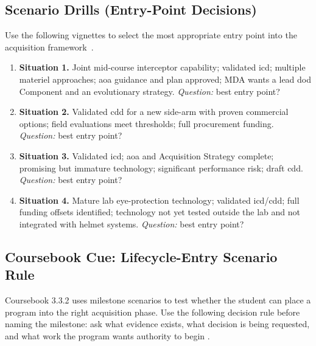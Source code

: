 \documentclass[../main.tex]{subfiles}
\begin{document}
\subsection{Scenario Drills (Entry-Point Decisions)}
Use the following vignettes to select the most appropriate entry point into the acquisition framework~\autocite{edo-3-3-2-acq-milestones-phases-2025}.
\begin{enumerate}
  \item \textbf{Situation 1.} Joint mid-course interceptor capability; validated \ac{icd}; multiple materiel approaches; \ac{aoa} guidance and plan approved; MDA wants a lead \ac{dod} Component and an evolutionary strategy. \emph{Question:} best entry point?
  \item \textbf{Situation 2.} Validated \ac{cdd} for a new side-arm with proven commercial options; field evaluations meet thresholds; full procurement funding. \emph{Question:} best entry point?
  \item \textbf{Situation 3.} Validated \ac{icd}; \ac{aoa} and Acquisition Strategy complete; promising but immature technology; significant performance risk; draft \ac{cdd}. \emph{Question:} best entry point?
  \item \textbf{Situation 4.} Mature lab eye-protection technology; validated \ac{icd}/\ac{cdd}; full funding offsets identified; technology not yet tested outside the lab and not integrated with helmet systems. \emph{Question:} best entry point?
\end{enumerate}

\subsection{Coursebook Cue: Lifecycle-Entry Scenario Rule}

Coursebook 3.3.2 uses milestone scenarios to test whether the student can place
a program into the right acquisition phase. Use the following decision rule
before naming the milestone: ask what evidence exists, what decision is being
requested, and what work the program wants authority to begin
\autocite{edo-3-3-2-acq-milestones-phases-2025}.
\end{document}
